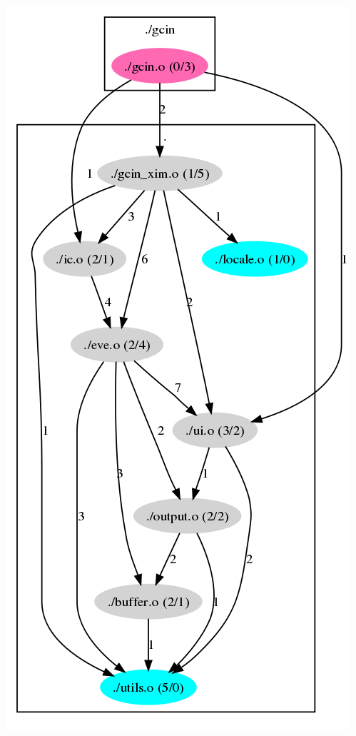 \begin{frame}[plain]
\begin{columns}
		\begin{center}
			\includegraphics[scale=.2]{xim-demo-b.png}
		\end{center}
	\end{columns}
\end{frame}

